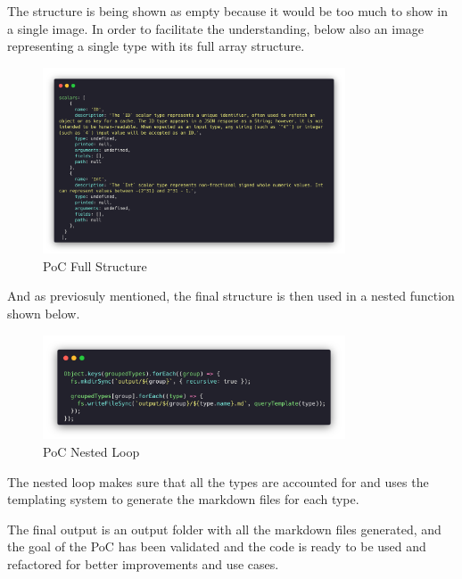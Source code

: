 The structure is being shown as empty because it would be too much to show in a
single image. In order to facilitate the understanding, below also an image
representing a single type with its full array structure.

\begin{figure}[H]
  \centering
  \includegraphics[width=0.8\textwidth]{figures/code/poc-full-structure.png}
  \caption{PoC Full Structure}
  \label{f:ch5-poc-full-structure}
\end{figure}

And as previosuly mentioned, the final structure is then used in a nested
function shown below.

\begin{figure}[H]
  \centering
  \includegraphics[width=0.8\textwidth]{figures/code/poc-nested-function.png}
  \caption{PoC Nested Loop}
  \label{f:ch5-poc-nested-loop}
\end{figure}

The nested loop makes sure that all the types are accounted for and uses the
templating system to generate the markdown files for each type.

The final output is an output folder with all the markdown files generated, and
the goal of the PoC has been validated and the code is ready to be used and
refactored for better improvements and use cases.

